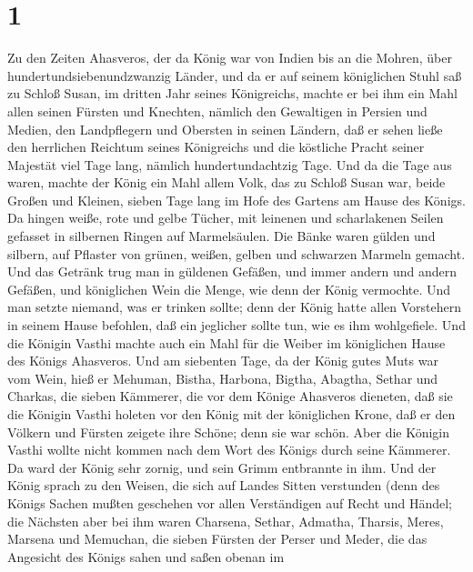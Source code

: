 \hypertarget{section}{%
\section{1}\label{section}}

 Zu den Zeiten Ahasveros, der da König war von Indien bis an
die Mohren, über hundertundsiebenundzwanzig Länder,  und da
er auf seinem königlichen Stuhl saß zu Schloß Susan,  im
dritten Jahr seines Königreichs, machte er bei ihm ein Mahl allen seinen
Fürsten und Knechten, nämlich den Gewaltigen in Persien und Medien, den
Landpflegern und Obersten in seinen Ländern,  daß er sehen
ließe den herrlichen Reichtum seines Königreichs und die köstliche
Pracht seiner Majestät viel Tage lang, nämlich hundertundachtzig Tage.
 Und da die Tage aus waren, machte der König ein Mahl allem
Volk, das zu Schloß Susan war, beide Großen und Kleinen, sieben Tage
lang im Hofe des Gartens am Hause des Königs.  Da hingen
weiße, rote und gelbe Tücher, mit leinenen und scharlakenen Seilen
gefasset in silbernen Ringen auf Marmelsäulen. Die Bänke waren gülden
und silbern, auf Pflaster von grünen, weißen, gelben und schwarzen
Marmeln gemacht.  Und das Getränk trug man in güldenen
Gefäßen, und immer andern und andern Gefäßen, und königlichen Wein die
Menge, wie denn der König vermochte.  Und man setzte
niemand, was er trinken sollte; denn der König hatte allen Vorstehern in
seinem Hause befohlen, daß ein jeglicher sollte tun, wie es ihm
wohlgefiele.  Und die Königin Vasthi machte auch ein Mahl
für die Weiber im königlichen Hause des Königs Ahasveros. 
Und am siebenten Tage, da der König gutes Muts war vom Wein, hieß er
Mehuman, Bistha, Harbona, Bigtha, Abagtha, Sethar und Charkas, die
sieben Kämmerer, die vor dem Könige Ahasveros dieneten, 
daß sie die Königin Vasthi holeten vor den König mit der königlichen
Krone, daß er den Völkern und Fürsten zeigete ihre Schöne; denn sie war
schön.  Aber die Königin Vasthi wollte nicht kommen nach
dem Wort des Königs durch seine Kämmerer. Da ward der König sehr zornig,
und sein Grimm entbrannte in ihm.  Und der König sprach zu
den Weisen, die sich auf Landes Sitten verstunden (denn des Königs
Sachen mußten geschehen vor allen Verständigen auf Recht und Händel;
 die Nächsten aber bei ihm waren Charsena, Sethar, Admatha,
Tharsis, Meres, Marsena und Memuchan, die sieben Fürsten der Perser und
Meder, die das Angesicht des Königs sahen und saßen obenan im
